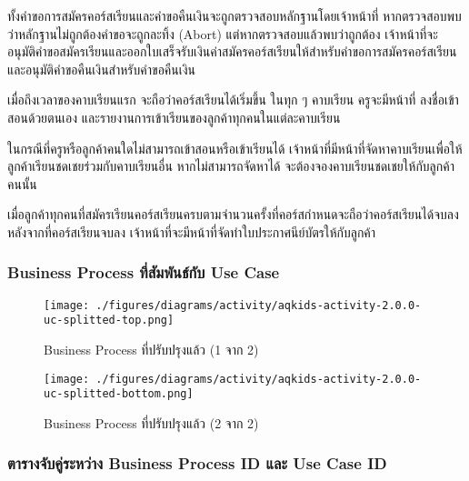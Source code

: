 ทั้งคำขอการสมัครคอร์สเรียนและคำขอคืนเงินจะถูกตรวจสอบหลักฐานโดยเจ้าหน้าที่ หากตรวจสอบพบว่าหลักฐานไม่ถูกต้องคำขอจะถูกละทิ้ง (Abort) แต่หากตรวจสอบแล้วพบว่าถูกต้อง เจ้าหน้าที่จะอนุมัติคำขอสมัครเรียนและออกใบเสร็จรับเงินค่าสมัครคอร์สเรียนให้สำหรับคำขอการสมัครคอร์สเรียน และอนุมัติคำขอคืนเงินสำหรับคำขอคืนเงิน

เมื่อถึงเวลาของคาบเรียนแรก จะถือว่าคอร์สเรียนได้เริ่มขึ้น ในทุก ๆ คาบเรียน ครูจะมีหน้าที่
ลงชื่อเข้าสอนด้วยตนเอง และรายงานการเข้าเรียนของลูกค้าทุกคนในแต่ละคาบเรียน

ในกรณีที่ครูหรือลูกค้าคนใดไม่สามารถเข้าสอนหรือเข้าเรียนได้ เจ้าหน้าที่มีหน้าที่จัดหาคาบเรียนเพื่อให้ลูกค้าเรียนชดเชยร่วมกับคาบเรียนอื่น หากไม่สามารถจัดหาได้ จะต้องจองคาบเรียนชดเชยให้กับลูกค้าคนนั้น

เมื่อลูกค้าทุกคนที่สมัครเรียนคอร์สเรียนครบตามจำนวนครั้งที่คอร์สกำหนดจะถือว่าคอร์สเรียนได้จบลง
หลังจากที่คอร์สเรียนจบลง เจ้าหน้าที่จะมีหน้าที่จัดทำใบประกาศนีย์บัตรให้กับลูกค้า

\subsubsection{Business Process ที่สัมพันธ์กับ Use Case}

\begin{figure}[H]
\texttt{[image: ./figures/diagrams/activity/aqkids-activity-2.0.0-uc-splitted-top.png]}
\caption{Business Process ที่ปรับปรุงแล้ว (1 จาก 2)}
\label{fig:aqkids-activity-uc-final-1}
\end{figure}

\begin{figure}[H]
\texttt{[image: ./figures/diagrams/activity/aqkids-activity-2.0.0-uc-splitted-bottom.png]}
\caption{Business Process ที่ปรับปรุงแล้ว (2 จาก 2)}
\label{fig:aqkids-activity-uc-final-2}
\end{figure}


\subsubsection{ตารางจับคู่ระหว่าง Business Process ID และ Use Case ID}

